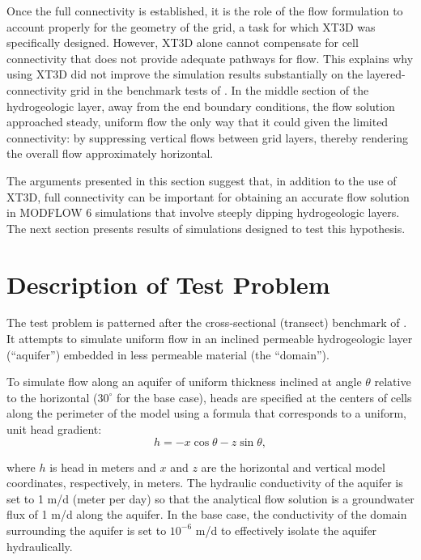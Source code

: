 \documentclass{article}
\begin{document}
Once the full connectivity is established, it is the role of the flow formulation to account properly for the geometry of the grid, a task for which XT3D was specifically designed. However, XT3D alone cannot compensate for cell connectivity that does not provide adequate pathways for flow. This explains why using XT3D did not improve the simulation results substantially on the layered-connectivity grid in the benchmark tests of \cite{bardot2023}.  In the middle section of the hydrogeologic layer, away from the end boundary conditions, the flow solution approached steady, uniform flow the only way that it could given the limited connectivity: by suppressing vertical flows between grid layers, thereby rendering the overall flow approximately horizontal.

The arguments presented in this section suggest that, in addition to the use of XT3D, full connectivity can be important for obtaining an accurate flow solution in MODFLOW 6 simulations that involve steeply dipping hydrogeologic layers. The next section presents results of simulations designed to test this hypothesis.

\section*{Description of Test Problem}

The test problem is patterned after the cross-sectional (transect) benchmark of \cite{bardot2023}. It attempts to simulate uniform flow in an inclined permeable hydrogeologic layer (``aquifer'') embedded in less permeable material (the ``domain'').

To simulate flow along an aquifer of uniform thickness inclined at angle $\theta$ relative to the horizontal ($30^{\circ}$ for the base case), heads are specified at the centers of cells along the perimeter of the model using a formula that corresponds to a uniform, unit head gradient:
\begin{equation}
\label{eqn:head_analyt_along}
h = - x \cos \theta - z \sin \theta,
\end{equation}

\noindent where $h$ is head in meters and $x$ and $z$ are the horizontal and vertical model coordinates, respectively, in meters. The hydraulic conductivity of the aquifer is set to 1 m/d (meter per day) so that the analytical flow solution is a groundwater flux of 1 m/d along the aquifer. In the base case, the conductivity of the domain surrounding the aquifer is set to $10^{-6}$ m/d to effectively isolate the aquifer hydraulically.
\end{document}
